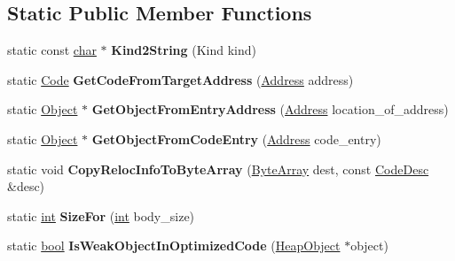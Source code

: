 \subsection*{Static Public Member Functions}
\begin{DoxyCompactItemize}
\item 
\mbox{\label{classv8_1_1internal_1_1Code_a4f341eb1728094338978e676ba787bac}} 
static const \mbox{\hyperlink{classchar}{char}} $\ast$ {\bfseries Kind2\+String} (Kind kind)
\item 
\mbox{\label{classv8_1_1internal_1_1Code_a97f02b725f18b8da969a462a525e64ed}} 
static \mbox{\hyperlink{classv8_1_1internal_1_1Code}{Code}} {\bfseries Get\+Code\+From\+Target\+Address} (\mbox{\hyperlink{classuintptr__t}{Address}} address)
\item 
\mbox{\label{classv8_1_1internal_1_1Code_ab848ed45a70efa2b3c2e3a30050f22d9}} 
static \mbox{\hyperlink{classv8_1_1internal_1_1Object}{Object}} $\ast$ {\bfseries Get\+Object\+From\+Entry\+Address} (\mbox{\hyperlink{classuintptr__t}{Address}} location\+\_\+of\+\_\+address)
\item 
\mbox{\label{classv8_1_1internal_1_1Code_ae4b59253e599d4dfcebb031d13e1ec95}} 
static \mbox{\hyperlink{classv8_1_1internal_1_1Object}{Object}} $\ast$ {\bfseries Get\+Object\+From\+Code\+Entry} (\mbox{\hyperlink{classuintptr__t}{Address}} code\+\_\+entry)
\item 
\mbox{\label{classv8_1_1internal_1_1Code_a8d4b0af6bd51e854cb2c743d87c4c3c4}} 
static void {\bfseries Copy\+Reloc\+Info\+To\+Byte\+Array} (\mbox{\hyperlink{classv8_1_1internal_1_1ByteArray}{Byte\+Array}} dest, const \mbox{\hyperlink{structv8_1_1internal_1_1CodeDesc}{Code\+Desc}} \&desc)
\item 
\mbox{\label{classv8_1_1internal_1_1Code_acad887ee43af2a9777cd0569940d54e1}} 
static \mbox{\hyperlink{classint}{int}} {\bfseries Size\+For} (\mbox{\hyperlink{classint}{int}} body\+\_\+size)
\item 
\mbox{\label{classv8_1_1internal_1_1Code_aeaa3cc6bf1397ebf2bbed25392d67aeb}} 
static \mbox{\hyperlink{classbool}{bool}} {\bfseries Is\+Weak\+Object\+In\+Optimized\+Code} (\mbox{\hyperlink{classv8_1_1internal_1_1HeapObject}{Heap\+Object}} $\ast$object)
\end{DoxyCompactItemize}
